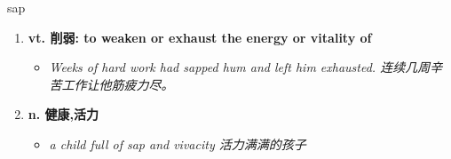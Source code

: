 
\begin{frame}
{\huge sap}
\begin{center}
\begin{enumerate}\Large
  \item \textbf{vt. 削弱: to weaken or exhaust the energy or vitality of}
  \begin{itemize}
    \item \em{\Large{Weeks of hard work had sapped hum and left him exhausted. 连续几周辛苦工作让他筋疲力尽。}}
  \end{itemize}
  \item \textbf{n. 健康,活力}
  \begin{itemize}
    \item \em{\Large{a child full of sap and vivacity 活力满满的孩子}}
  \end{itemize}
\end{enumerate}
\end{center}
\end{frame}
